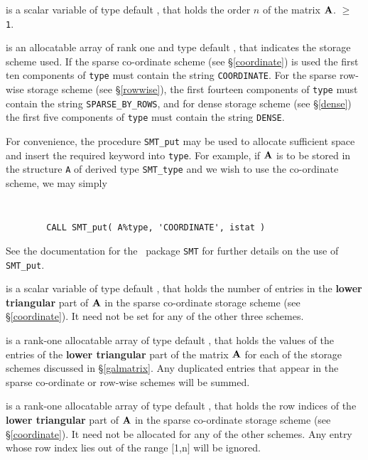 \documentclass{galahad}
\begin{document}
\begin{description}

 is a scalar variable of type default \integer, that holds
the order $n$ of the matrix  ${\mathbf{A}}$.
 $\geq$ {\tt 1}.

 is an allocatable array of rank one and type default \character, that
indicates the storage scheme used. If the
sparse co-ordinate scheme (see \S\ref{coordinate}) is used
the first ten components of {\tt type} must contain the
string {\tt COORDINATE}.
For the sparse row-wise storage scheme (see \S\ref{rowwise}),
the first fourteen components of {\tt type} must contain the
string {\tt SPARSE\_BY\_ROWS}, and
for dense storage scheme (see \S\ref{dense})
the first five components of {\tt type} must contain the
string {\tt DENSE}.

For convenience, the procedure {\tt SMT\_put}
may be used to allocate sufficient space and insert the required keyword
into {\tt type}.
For example, if ${\mathbf{A}}$ is to be stored in the structure {\tt A}
of derived type {\tt SMT\_type} and we wish to use
the co-ordinate scheme, we may simply
{\tt
\begin{verbatim}
        CALL SMT_put( A%type, 'COORDINATE', istat )
\end{verbatim}
}
\noindent
See the documentation for the \galahad\ package {\tt SMT}
for further details on the use of {\tt SMT\_put}.

 is a scalar variable of type default \integer, that
holds the number of entries in the {\bf lower triangular} part of ${\mathbf{A}}$
in the sparse co-ordinate storage scheme (see \S\ref{coordinate}).
It need not be set for any of the other three schemes.

 is a rank-one allocatable array of type default \realdp, that holds
the values of the entries of the {\bf lower triangular} part
of the matrix ${\mathbf{A}}$ for each of the
storage schemes discussed in \S\ref{galmatrix}.
Any duplicated entries that appear in the sparse
co-ordinate or row-wise schemes will be summed.

 is a rank-one allocatable array of type default \integer,
that holds the row indices of the {\bf lower triangular} part of ${\mathbf{A}}$
in the sparse co-ordinate storage
scheme (see \S\ref{coordinate}).
It need not be allocated for any of the other schemes.
Any entry whose row index lies out of the range $[$1,n$]$ will be ignored.


\end{description}
\end{document}
